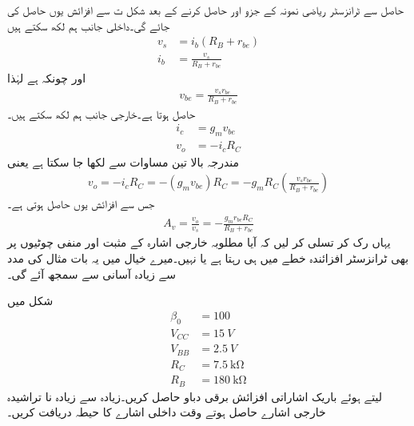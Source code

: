 حاصل  سے ٹرانزسٹر ریاضی نمونہ  کے جزو  اور  حاصل کرنے کے بعد شکل  ت سے افزائش  یوں حاصل کی جائے گی۔داخلی جانب ہم لکھ سکتے ہیں
\begin{align*}
v_s&=i_b \left (R_B+r_{be} \right )\\
i_b&=\frac{v_s}{R_B+r_{be}}
\end{align*}
اور چونکہ  ہے لہٰذا
\begin{align*}
v_{be}=\frac{v_s r_{be}}{R_B+r_{be}}
\end{align*}
حاصل ہوتا ہے۔خارجی جانب ہم لکھ سکتے ہیں۔
\begin{align*}
i_c&=g_m v_{be}\\
v_o&=-i_c R_C
\end{align*}
مندرجہ بالا تین  مساوات سے   لکھا جا سکتا ہے یعنی
\begin{align*}
v_o = -i_c R_C = -\left(g_m v_{be} \right )R_C=-g_m R_C \left(\frac{v_s r_{be}}{R_B+r_{be}} \right )
\end{align*}
جس سے افزائش  یوں حاصل ہوتی ہے۔
\begin{align} \label{مساوات_ٹرانزسٹر_ایمپلیفائر_بغیر_مخارج_مزاحمت_کی_افزائش}
A_v = \frac{v_o}{v_s}=-\frac{g_m r_{be} R_C}{R_B+r_{be}}
\end{align}
	یہاں رک کر تسلی کر لیں کہ آیا مطلوبہ خارجی اشارہ   کے مثبت اور منفی چوٹیوں پر بھی ٹرانزسٹر افزائندہ خطے میں ہی رہتا ہے یا نہیں۔میرے خیال میں یہ بات مثال کی مدد سے زیادہ آسانی سے سمجھ آئے گی۔

شکل   میں
\begin{align*}
\beta_0&=\num{100}\\
V_{CC}&=\SI{15}{V}\\
V_{BB}&=\SI{2.5}{V}\\
R_C&=\SI{7.5}{ \kilo \ohm}\\
R_B&=\SI{180}{\kilo \ohm}
\end{align*}
لیتے ہوئے باریک اشاراتی افزائش برقی دباو  حاصل کریں۔زیادہ سے زیادہ نا تراشیدہ خارجی اشارے حاصل ہوتے وقت داخلی اشارے کا حیطہ دریافت کریں۔


